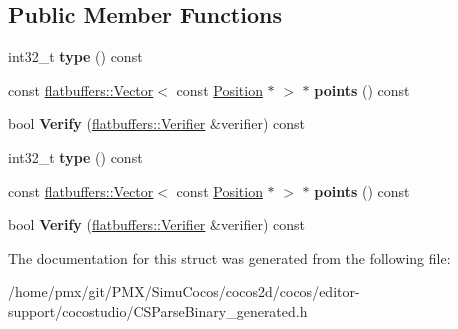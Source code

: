 \subsection*{Public Member Functions}
\begin{DoxyCompactItemize}
\item 
\mbox{\label{structflatbuffers_1_1EasingData_a3af33a6b0645f8a40ec8e044cd2588b9}} 
int32\+\_\+t {\bfseries type} () const
\item 
\mbox{\label{structflatbuffers_1_1EasingData_acbf3dd6629eed37c416ab8d6b2fb361d}} 
const \hyperlink{classflatbuffers_1_1Vector}{flatbuffers\+::\+Vector}$<$ const \hyperlink{structPosition}{Position} $\ast$ $>$ $\ast$ {\bfseries points} () const
\item 
\mbox{\label{structflatbuffers_1_1EasingData_ab215a0204e2bc2642abde2f54b82f8ea}} 
bool {\bfseries Verify} (\hyperlink{classflatbuffers_1_1Verifier}{flatbuffers\+::\+Verifier} \&verifier) const
\item 
\mbox{\label{structflatbuffers_1_1EasingData_a3af33a6b0645f8a40ec8e044cd2588b9}} 
int32\+\_\+t {\bfseries type} () const
\item 
\mbox{\label{structflatbuffers_1_1EasingData_acbf3dd6629eed37c416ab8d6b2fb361d}} 
const \hyperlink{classflatbuffers_1_1Vector}{flatbuffers\+::\+Vector}$<$ const \hyperlink{structPosition}{Position} $\ast$ $>$ $\ast$ {\bfseries points} () const
\item 
\mbox{\label{structflatbuffers_1_1EasingData_ab215a0204e2bc2642abde2f54b82f8ea}} 
bool {\bfseries Verify} (\hyperlink{classflatbuffers_1_1Verifier}{flatbuffers\+::\+Verifier} \&verifier) const
\end{DoxyCompactItemize}


The documentation for this struct was generated from the following file\+:\begin{DoxyCompactItemize}
\item 
/home/pmx/git/\+P\+M\+X/\+Simu\+Cocos/cocos2d/cocos/editor-\/support/cocostudio/C\+S\+Parse\+Binary\+\_\+generated.\+h\end{DoxyCompactItemize}
